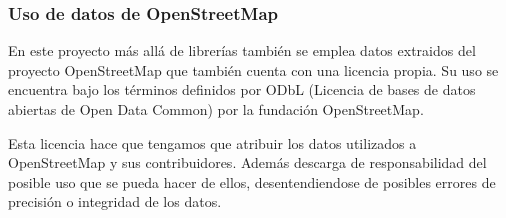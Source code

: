 \subsubsection{Uso de datos de OpenStreetMap}

En este proyecto más allá de librerías también se emplea datos extraidos del proyecto OpenStreetMap que también cuenta con una licencia propia. Su uso se encuentra bajo los términos definidos por ODbL (Licencia de bases de datos abiertas de Open Data Common) por la fundación OpenStreetMap.

Esta licencia hace que tengamos que atribuir los datos utilizados a OpenStreetMap y sus contribuidores. Además descarga de responsabilidad del posible uso que se pueda hacer de ellos, desentendiendose de posibles errores de precisión o integridad de los datos.

